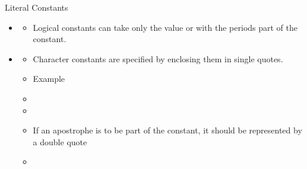 \documentclass[10pt,t]{beamer}
\begin{document}
\begin{frame}[allowframebreaks]{Literal Constants}
\begin{itemize}
\begin{itemize}
      \item Example
      \item[] 
      \item[] 
      \item For systems that support double precision complex, the floating point constants must use the {\em d} notation.
      \item[] 
    \end{itemize}
    \item[] 
    \begin{itemize}
      \item Logical constants can take only the value  or  with the periods part of the constant.
    \end{itemize}
    \framebreak
    \item[] 
    \begin{itemize}
      \footnotesize
      \item Character constants are specified by enclosing them in single quotes.
      \item Example
      \item[] 
      \item[] 
      \item If an apostrophe is to be part of the constant, it should be represented by a double quote
      \item[] 
    \end{itemize}
  \end{itemize}
\end{frame}
\end{document}
